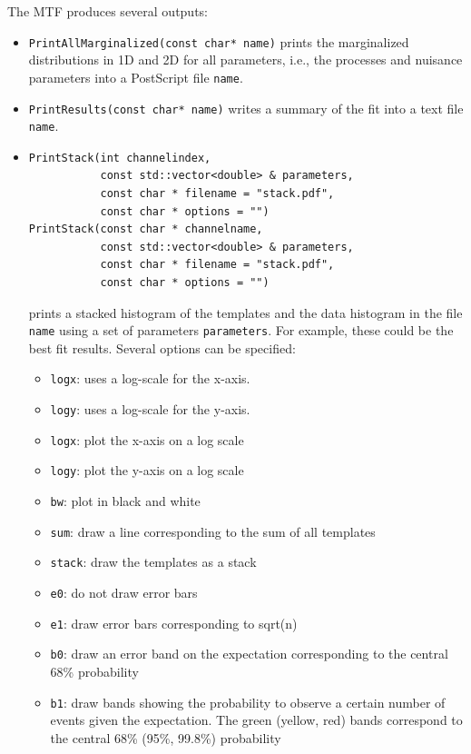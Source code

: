 \documentclass[11pt, a4paper]{article}
\begin{document}
The MTF produces several outputs:
%
\begin{itemize}
\item \verb|PrintAllMarginalized(const char* name)| prints the
  marginalized distributions in 1D and 2D for all parameters, i.e.,
  the processes and nuisance parameters into a PostScript file
  \verb|name|.
\item \verb|PrintResults(const char* name)| writes a summary of the
  fit into a text file \verb|name|.
\item
\begin{verbatim}
PrintStack(int channelindex,
           const std::vector<double> & parameters,
           const char * filename = "stack.pdf",
           const char * options = "")
PrintStack(const char * channelname,
           const std::vector<double> & parameters,
           const char * filename = "stack.pdf",
           const char * options = "")
\end{verbatim}
  prints a stacked histogram of the templates and the data histogram
  in the file \verb|name| using a set of parameters
  \verb|parameters|. For example, these could be the best fit
  results. Several options can be specified:
  \begin{itemize}
    \item \verb|logx|: uses a log-scale for the x-axis.
    \item \verb|logy|: uses a log-scale for the y-axis.
    \item \verb|logx|: plot the x-axis on a log scale
    \item \verb|logy|: plot the y-axis on a log scale
    \item \verb|bw|: plot in black and white
    \item \verb|sum|: draw a line corresponding to the sum of all templates
    \item \verb|stack|: draw the templates as a stack
    \item \verb|e0|: do not draw error bars
    \item \verb|e1|: draw error bars corresponding to sqrt(n)
    \item \verb|b0|: draw an error band on the expectation corresponding to the central 68\% probability
    \item \verb|b1|: draw bands showing the probability to observe a certain number of events given the expectation. The green (yellow, red) bands correspond to the central 68\% (95\%, 99.8\%) probability
  \end{itemize}
\end{itemize}
\end{document}
